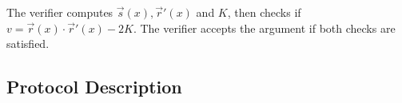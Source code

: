 The verifier computes $\vec{s}(x), \vec{r}'(x) $ and $K$, then checks if $v = \vec{r}(x) \cdot \vec{r}'(x)-2K$.
%
The verifier accepts the argument if both checks are satisfied.

\subsection{Protocol Description}\label{prot:5ac}

